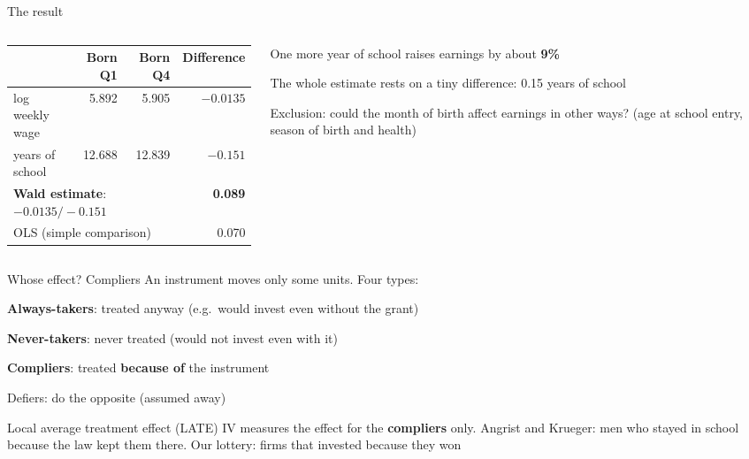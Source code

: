\documentclass[aspectratio=169,xcolor=table]{beamer}
\begin{document}
\begin{frame}{The result}
\begin{columns}[T]
\begin{column}{0.58\textwidth}
\centering\footnotesize
\begin{tabular}{lrrr}
\toprule
 & \textbf{Born Q1} & \textbf{Born Q4} & \textbf{Difference} \\
\midrule
log weekly wage & 5.892 & 5.905 & $-0.0135$ \\
years of school & 12.688 & 12.839 & $-0.151$ \\
\midrule
\multicolumn{3}{l}{\textbf{Wald estimate}: $-0.0135 / -0.151$} & \textbf{0.089} \\
\multicolumn{3}{l}{OLS (simple comparison)} & 0.070 \\
\bottomrule
\end{tabular}
\end{column}
\begin{column}{0.38\textwidth}
\small
\bi
  \item One more year of school raises earnings by about \textbf{9\%}
  \item The whole estimate rests on a tiny difference: 0.15 years of school
  \item Exclusion: could the month of birth affect earnings in other ways? (age at school entry, season of birth and health)
\ei
\end{column}
\end{columns}
\end{frame}

\begin{frame}{Whose effect? Compliers}
\small
An instrument moves only some units. Four types:
\bi
  \item \textbf{Always-takers}: treated anyway (e.g.\ would invest even without the grant)
  \item \textbf{Never-takers}: never treated (would not invest even with it)
  \item \textbf{Compliers}: treated \textbf{because of} the instrument
  \item Defiers: do the opposite (assumed away)
\ei
\begin{block}{Local average treatment effect (LATE)}
IV measures the effect for the \textbf{compliers} only. Angrist and Krueger: men who stayed in school because the law kept them there. Our lottery: firms that invested because they won
\end{block}
\end{frame}
\end{document}
